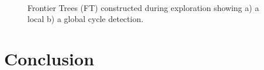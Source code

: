 \documentclass[twocolumn]{svjour3}[2016]
\begin{document}
\begin{figure}
\centering
  \mbox{
  }
  \caption{Frontier Trees (FT) constructed during exploration showing a) a local b) a global cycle detection.}
  \label{fig9}
\end{figure}
\section{Conclusion}
\end{document}
